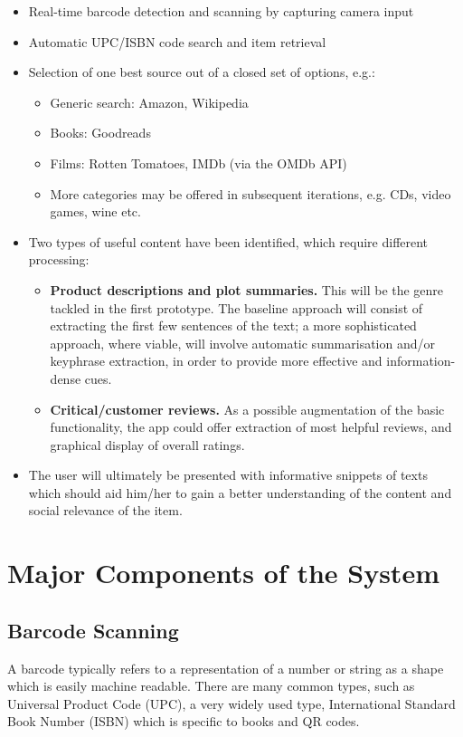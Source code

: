 \documentclass[12pt,a4paper]{report}
\begin{document}
\begin{itemize}
	\item Real-time barcode detection and scanning by capturing camera input
	\item Automatic UPC/ISBN code search and item retrieval
	\item Selection of one best source out of a closed set of options, e.g.:
	\begin{itemize}
		\item Generic search: Amazon, Wikipedia
		\item Books: Goodreads
		\item Films: Rotten Tomatoes, IMDb (via the OMDb API)
		\item More categories may be offered in subsequent iterations, e.g. CDs, video games, wine etc.
	\end{itemize}
	\item Two types of useful content have been identified, which require different processing:
	\begin{itemize}
		\item \textbf{Product descriptions and plot summaries.} This will be the genre tackled in the first prototype. The baseline approach will consist of extracting the first few sentences of the text; a more sophisticated approach, where viable, will involve automatic summarisation and/or keyphrase extraction, in order to provide more effective and information-dense cues.
		\item \textbf{Critical/customer reviews.} As a possible augmentation of the basic functionality, the app could offer extraction of most helpful reviews, and graphical display of overall ratings.
	\end{itemize}
	\item The user will ultimately be presented with informative snippets of texts which should aid him/her to gain a better understanding of the content and social relevance of the item.
\end{itemize}

\chapter{Major Components of the System}

\section{Barcode Scanning}

A barcode typically refers to a representation of a number or string as a shape which is easily machine readable. There are many common types, such as Universal Product Code (UPC), a very widely used type, International Standard Book Number (ISBN) which is specific to books and QR codes.
\end{document}
